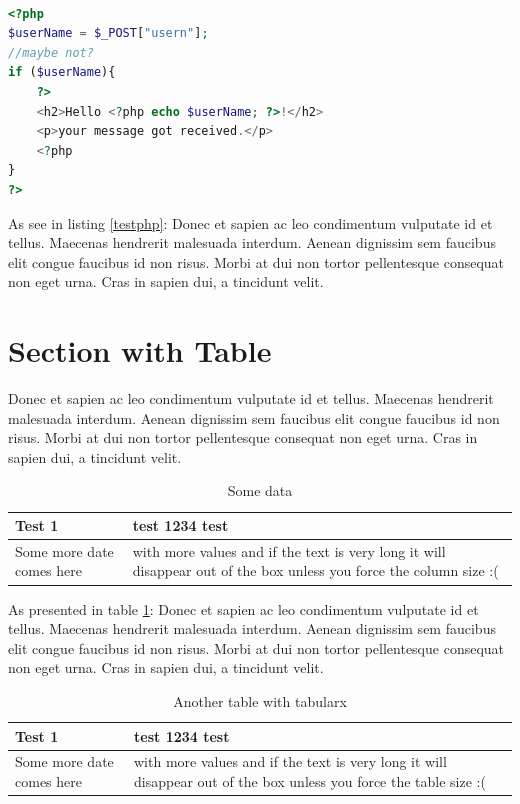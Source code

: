 \documentclass[11pt,a4paper,oneside,article]{memoir}
\begin{document}
\vspace{-22pt}\begin{lstlisting}[language=PHP,caption={Descriptive Caption Text},label=testphp] 

<?php
$userName = $_POST["usern"];
//maybe not?
if ($userName){
	?>
	<h2>Hello <?php echo $userName; ?>!</h2>
	<p>your message got received.</p>
	<?php
}
?>
\end{lstlisting}\vspace{-22pt}


As see in listing \ref{testphp}: Donec et sapien ac leo condimentum vulputate id et tellus. Maecenas hendrerit malesuada interdum. Aenean dignissim sem faucibus elit congue faucibus id non risus. Morbi at dui non tortor pellentesque consequat non eget urna. Cras in sapien dui, a tincidunt velit.

\section{Section with Table}
Donec et sapien ac leo condimentum vulputate id et tellus. Maecenas hendrerit malesuada interdum. Aenean dignissim sem faucibus elit congue faucibus id non risus. Morbi at dui non tortor pellentesque consequat non eget urna. Cras in sapien dui, a tincidunt velit.

\begin{table}[h]
  \centering
  \caption{Some data}
  \begin{tabular}{| l | >{\centering\arraybackslash}p{} |}
    \hline
    Test 1 & test 1234 test \\
    \hline
    Some more date comes here & with more values and if the text is very long it will disappear out of the box unless you force the column size :( \\
    \hline
  \end{tabular}
  \label{table:some_data}
\end{table}


As presented in table \ref{table:some_data}: Donec et sapien ac leo condimentum vulputate id et tellus. Maecenas hendrerit malesuada interdum. Aenean dignissim sem faucibus elit congue faucibus id non risus. Morbi at dui non tortor pellentesque consequat non eget urna. Cras in sapien dui, a tincidunt velit.

\begin{table}[h]
  \centering
  \caption{Another table with tabularx}
  \begin{tabularx}{.95\textwidth}{| l | >{\centering\arraybackslash} X |}
    \hline
    Test 1 & test 1234 test \\
    \hline
    Some more date comes here & with more values and if the text is very long it will disappear out of the box unless you force the table size :( \\
    \hline
  \end{tabularx}
  \label{table:some_data2}
\end{table}
\end{document}
